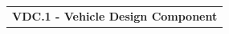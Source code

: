 \documentclass [10pt]{article}
\begin{document}






    
    
\begin{longtable}{p{}}
\rowcolor{tableCell}\textbf{VDC.1 - Vehicle Design Component} \\
\end{longtable}
\end{document}
